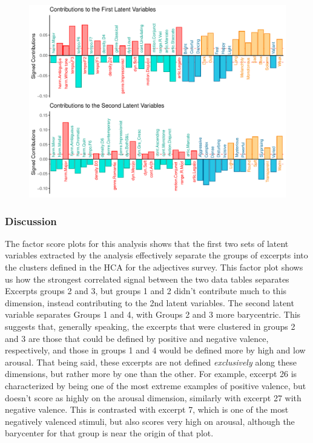 \documentclass[
  english,
  man,floatsintext]{apa6}
\begin{document}
\begin{figure}

{\centering \includegraphics{Music-Descriptor-Space_files/figure-latex/contsplsc-1} 

}

\caption{ }\label{fig:contsplsc}
\end{figure}

\hypertarget{discussion-2}{%
\subsubsection{Discussion}\label{discussion-2}}

The factor score plots for this analysis shows that the first two sets of latent variables extracted by the analysis effectively separate the groups of excerpts into the clusters defined in the HCA for the adjectives survey. This factor plot shows us how the strongest correlated signal between the two data tables separates Excerpts groups 2 and 3, but groups 1 and 2 didn't contribute much to this dimension, instead contributing to the 2nd latent variables. The second latent variable separates Groups 1 and 4, with Groups 2 and 3 more barycentric. This suggests that, generally speaking, the excerpts that were clustered in groups 2 and 3 are those that could be defined by positive and negative valence, respectively, and those in groups 1 and 4 would be defined more by high and low arousal. That being said, these excerpts are not defined \emph{exclusively} along these dimensions, but rather more by one than the other. For example, excerpt 26 is characterized by being one of the most extreme examples of positive valence, but doesn't score as highly on the arousal dimension, similarly with excerpt 27 with negative valence. This is contrasted with excerpt 7, which is one of the most negatively valenced stimuli, but also scores very high on arousal, although the barycenter for that group is near the origin of that plot.
\end{document}
